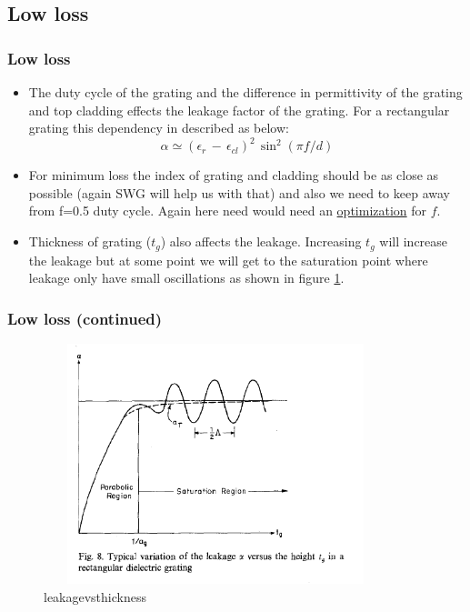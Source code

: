 \documentclass{beamer}
\begin{document}
\subsection{Low loss}
\begin{frame}
\frametitle{Low loss}
\begin{itemize}
\item  The duty cycle of the grating and the difference in permittivity of the grating and top cladding effects the leakage factor of the grating. For a rectangular grating this dependency in described as below:
    \begin{equation}
    \alpha \simeq (\epsilon_r \,- \, \epsilon_{cl})^2 \, \sin^2(\pi f /d)
    \end{equation}
\item For minimum loss the index of grating and cladding should be as close as possible (again SWG will help us with that) and also we need to keep away from f=0.5 duty cycle. Again here need would need an \underline{optimization} for $f$.
\item Thickness of grating ($t_g$) also affects the leakage. Increasing $t_g$ will increase the leakage but at some point we will get to the saturation point where leakage only have small oscillations as shown in figure \ref{loss1}.
\end{itemize}
\end{frame}
%
\begin{frame}
\frametitle{Low loss (continued)}
\begin{figure}[H]
\begin{center}
\includegraphics[width=10cm, height=7cm]{Figures/leakagevsthickness}
\caption{leakagevsthickness}
\label{loss1}
\end{center}
\end{figure}
\end{frame}
%
\end{document}
